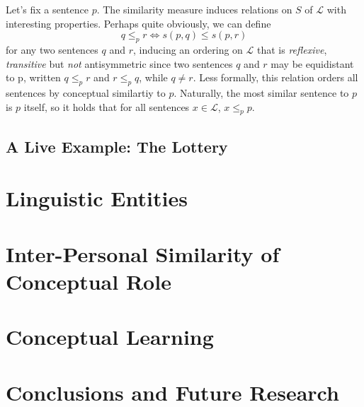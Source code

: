 \documentclass[11pt, a4paper]{article}
\renewcommand{\i}[1]{\emph{#1}}
\begin{document}
Let's fix a sentence $p$. The similarity measure induces relations on $S$ of $\mathcal{L}$ with interesting properties. Perhaps quite obviously, we can define 
\[
    q \leqslant_p r \Leftrightarrow s(p,q) \leqslant s(p,r)
\]
for any two sentences $q$ and $r$, inducing an ordering on $\mathcal{L}$ that is \i{reflexive}, \i{transitive} but \i{not} antisymmetric since two sentences $q$ and $r$ may be equidistant to p, written $q \leqslant_p r$ and $r \leqslant_p q$, while $q \not = r$. Less formally, this relation orders all sentences by conceptual similartiy to $p$. Naturally, the most similar sentence to $p$ is $p$ itself, so it holds that for all sentences ${x \in \mathcal{L}}$, ${x\leqslant_p p}$.





\subsection{A Live Example: The Lottery}
\section{Linguistic Entities}
\section{Inter-Personal Similarity of Conceptual Role}
\section{Conceptual Learning}
\section{Conclusions and Future Research}

\nocite{*}
\printbibliography{}
\end{document}
